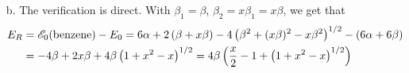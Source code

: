 \documentclass[a4paper]{book}
\newcounter{solution}[chapter]
\newcounter{eqs}[solution]
\newenvironment{sequation}
  {\begin{equation}\stepcounter{eqs}\tag{\thesolution-\theeqs}}
  {\end{equation}}
\renewcommand\det[1]{\mathrm{det\left(#1\right)}}
\newcommand{\I}{{\bf 1}}
\newcommand{\HH}{{\bf H}}
\begin{document}
\begin{solution}
\begin{itemize}
	At this time, we should remember that the H{\"u}ckel matrix is 
	\[
		\HH = \begin{pmatrix}
			\alpha & \beta_2 & 0 & 0 & 0 & \beta_1 \\
			\beta_2& \alpha  & \beta_1 & 0 & 0 & 0 \\
			0 & \beta_1& \alpha  & \beta_2 & 0 & 0 \\
			0 & 0 & \beta_2& \alpha  & \beta_1 & 0 \\
			0 & 0 & 0 & \beta_1& \alpha  & \beta_2 \\
			\beta_1 & 0 & 0 & 0 & \beta_2 & \alpha
		\end{pmatrix}.
	\]
	Its eigen function is
	\[
		\det{\HH-\varepsilon\I} = (\beta^2_1 - \beta_1 \beta_2 + \beta^2_2 - (\alpha - \varepsilon)^2)^2 (\alpha - \beta_1 - \beta_2 - \varepsilon) (\alpha + \beta_1 + \beta_2 - \varepsilon) = 0,
	\]
	and there are six roots:
	\begin{align*}
		\varepsilon_1 &= \alpha + \beta_1 + \beta_2 , \\
		\varepsilon_2 = \varepsilon_3 &= \alpha - \sqrt{ \beta^2_1 - \beta_1 \beta_2 + \beta^2_2 }, \\
		\varepsilon_4 = \varepsilon_5 &= \alpha + \sqrt{ \beta^2_1 - \beta_1 \beta_2 + \beta^2_2 }, \\
		\varepsilon_6 &= \alpha - \beta_1 - \beta_2 .
	\end{align*}
	Thus,
	\begin{sequation}
		\mathscr{E}^\prime_0({\rm benzene}) = 2\varepsilon_1 + 2\varepsilon_2 + 2\varepsilon_3 = 6\alpha + 2\left( \beta_1 + \beta_2 \right) - 4\left( \beta^2_1 + \beta^2_2 - \beta_1 \beta_2 \right)^{1/2} .
	\end{sequation}
	It equals the results obtained by using the general expression.
	
	\item[b.] The verification is direct. With $\beta_1 = \beta$, $\beta_2 = x\beta_1 = x\beta$, we get that
	\begin{align*}
		E_R &= \mathscr{E}_0({\rm benzene}) - E_0 = 6\alpha + 2\left( \beta + x \beta \right) - 4\left( \beta^2 + ( x \beta )^2 - x \beta^2 \right)^{1/2} - ( 6\alpha + 6\beta ) \\
		&= -4\beta + 2x \beta + 4\beta \left( 1 + x^2 - x \right)^{1/2} = 4\beta \left( \frac{x}{2} - 1 + \left( 1 + x^2 - x \right)^{1/2} \right)
	\end{align*}
	

\end{itemize}
\end{solution}
\end{document}
